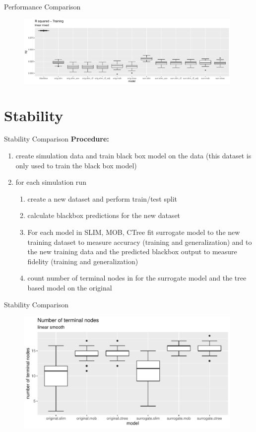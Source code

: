 \documentclass[9pt, xcolor=table]{beamer}
\begin{document}
\begin{frame}{Performance Comparison}
\begin{figure}
    \includegraphics[width=11cm]{Figures/Performance/linear_mixed/r2_train.pdf}
\end{figure}
\end{frame}


\section{Stability}
\begin{frame}{Stability Comparison}
\textbf{Procedure:} 
\begin{enumerate}
    \item create simulation data and train black box model on the data (this dataset is only used to train the black box model)
    \item for each simulation run 
    \begin{enumerate}
        \item create a new dataset and perform train/test split
        \item calculate blackbox predictions for the new dataset
        \item For each model in SLIM, MOB, CTree fit surrogate model to the new training dataset to measure accuracy (training and generalization) and to the new training data and the predicted blackbox output to measure fidelity (training and generalization)
        \item count number of terminal nodes in for the surrogate model and the tree based model on the original 
    \end{enumerate}
\end{enumerate}
\end{frame}

\begin{frame}{Stability Comparison}
\begin{figure}
    \includegraphics[width=11cm]{Figures/Stability/linear_smooth/nofnodes.pdf}
\end{figure}
\end{frame}
\end{document}
